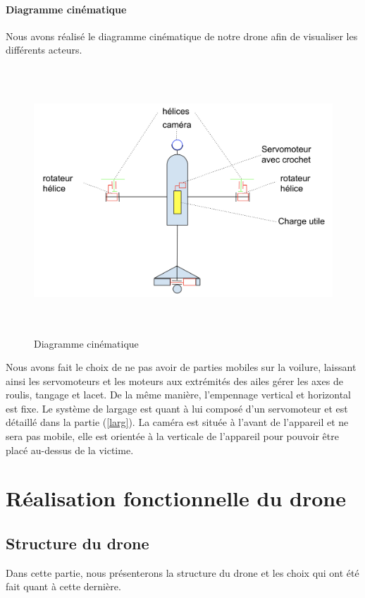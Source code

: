 \documentclass[a4paper,12pt,french]{report}
\begin{document}
\subsubsection{Diagramme cinématique}
Nous avons réalisé le diagramme cinématique de notre drone afin de visualiser les différents acteurs.
\begin{figure}[h]
    \centering
    \includegraphics[height=10cm]{figures/cine.png}
    \caption{Diagramme cinématique}
    \label{cine}
\end{figure}

Nous avons fait le choix de ne pas avoir de parties mobiles sur la voilure, laissant ainsi les servomoteurs et les moteurs aux extrémités des ailes gérer les axes de roulis, tangage et lacet. De la même manière, l’empennage vertical et horizontal est fixe. Le système de largage est quant à lui composé d’un servomoteur et est détaillé dans la partie (\ref{larg}). La caméra est située à l’avant de l’appareil et ne sera pas mobile, elle est orientée à la verticale de l’appareil pour pouvoir être placé au-dessus de la victime.

\chapter{Réalisation fonctionnelle du drone}

\section{Structure du drone}

Dans cette partie, nous présenterons la structure du drone et les choix qui ont été fait quant à cette dernière.
\end{document}
